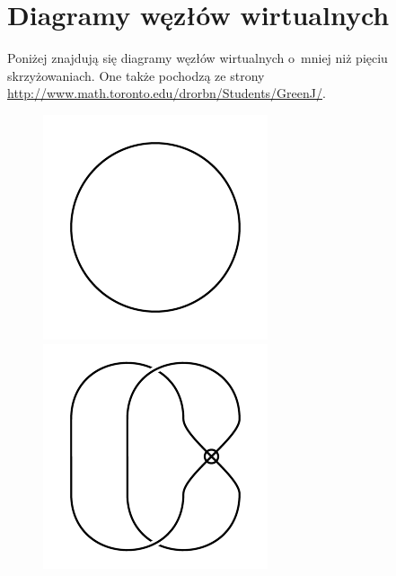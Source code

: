 
\section{Diagramy węzłów wirtualnych}
Poniżej znajdują się diagramy węzłów wirtualnych o~mniej niż pięciu skrzyżowaniach.
One także pochodzą ze strony \url{http://www.math.toronto.edu/drorbn/Students/GreenJ/}.

\begin{figure}[H]
\begin{minipage}[b]{.18\linewidth}
\centering
\includegraphics[width=\linewidth]{../data/virtual_0_1.png}
\end{minipage}
\begin{minipage}[b]{.18\linewidth}
\centering
\includegraphics[width=\linewidth]{../data/virtual_2_1.png}

\end{minipage}
\end{figure}
